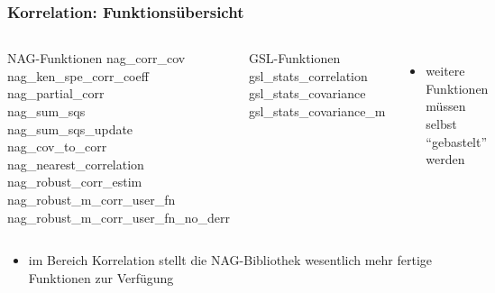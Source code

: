 \documentclass{beamer}
\begin{document}
\begin{frame}
	\frametitle{Korrelation: Funktionsübersicht}
	
	\begin{columns}
			\begin{block}{NAG-Funktionen}
				nag\_corr\_cov\\
				nag\_ken\_spe\_corr\_coeff\\
				nag\_partial\_corr\\
				nag\_sum\_sqs\\
				nag\_sum\_sqs\_update\\
				nag\_cov\_to\_corr\\
				nag\_nearest\_correlation\\
				nag\_robust\_corr\_estim\\
				nag\_robust\_m\_corr\_user\_fn\\
				nag\_robust\_m\_corr\_user\_fn\_no\_derr
			\end{block}
			\begin{block}{GSL-Funktionen}
				gsl\_stats\_correlation\\
				gsl\_stats\_covariance\\
				gsl\_stats\_covariance\_m
			\end{block}
			\begin{itemize}
				\item weitere Funktionen müssen selbst "`gebastelt"' werden
			\end{itemize}
	\end{columns}
	
	\begin{itemize}
		\item im Bereich Korrelation stellt die NAG-Bibliothek wesentlich mehr fertige Funktionen zur Verfügung
  \end{itemize}
\end{frame}
\end{document}
